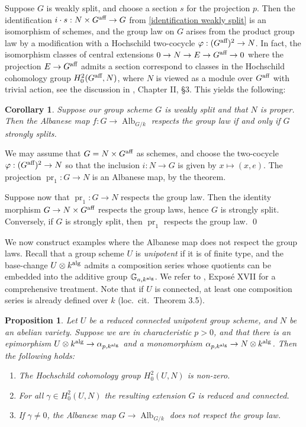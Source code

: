 \documentclass[oneside, 12pt]{amsart}
\newcommand\mylabel[1]{\label{#1}\marginpar{\vspace{-1ex}\medskip\medskip\footnotesize \tt #1}}
\renewcommand\mylabel[1]{\label{#1}}
\newtheorem{proposition}[theorem]{Proposition}
\newtheorem{corollary}[theorem]{Corollary}
\theoremstyle{definition}
\theoremstyle{remark}
\newcommand{\GG}{\mathbb{G}}
\newcommand{\aff}{\text{\rm aff}}
\newcommand{\alg}{\text{\rm alg}}
\newcommand{\Alb}{\operatorname{Alb}}
\newcommand{\pr}{\operatorname{pr}}
\newcommand{\ra}{\rightarrow}
\begin{document}
\medskip
Suppose $G$ is weakly split, and choose a section $s$ for the projection $p$.
Then the identification   $i\cdot s: N\times G^\aff\ra G$ from \eqref{identification weakly split}
is an isomorphism of schemes, and the group law on $G$ arises from the product group law by a modification
with a Hochschild two-cocycle $\varphi:(G^\aff)^2\ra N$. In fact, the isomorphism classes of central extensions $0\ra N\ra E\ra G^\aff\ra 0$ where the projection
$E\ra G^\aff$ admits a section correspond to 
classes in the Hochschild cohomology group $H^2_0(G^\aff, N)$, where $N$ is viewed as a module over $G^\aff$ with trivial action, see the discussion in
\cite{Demazure; Gabriel 1970}, Chapter II, \S3. This yields the following:
 
\begin{corollary}
\mylabel{albanese respect group law}
Suppose our group scheme $G$ is weakly split and that $N$ is proper. 
Then the Albanese map $f:G\ra \Alb_{G/k}$ respects the group law if and only if   $G$ strongly splits.
\end{corollary}

\proof
We may assume that $G=N\times G^\aff$ as schemes, and choose the two-cocycle $\varphi:(G^\aff)^2\ra N$ 
so that the inclusion $i:N\ra G$ is given by $x\mapsto (x,e)$.
The projection $\pr_1:G\ra N$ is   an Albanese map, by the theorem.

Suppose now that $\pr_1:G\ra N$ respects the group law.
Then the identity morphism $G\ra N\times G^\aff$ respects the group laws, hence $G$ is strongly split.
Conversely, if $G$ is strongly split, then $\pr_1$ respects the group law.
\qed

\medskip
We now construct examples where the Albanese map does not respect the group laws.
Recall that a group scheme $U$ is \emph{unipotent} if it is of finite type,
and the base-change $U\otimes k^\alg$ admits  a   composition series whose quotients can be embedded into the additive group $\GG_{a, k^\alg}$.
We refer to  \cite{SGA 3b}, Expos\'e XVII for a  comprehensive treatment.
Note that if $U$ is connected,  at least one composition series is already defined over $k$ (loc.\ cit.\ Theorem 3.5).

\begin{proposition}
\mylabel{albanese disrespects group law}
Let $U$ be a reduced connected unipotent group scheme, and $N$ be an abelian variety.
Suppose we are in characteristic $p>0$, and that there is an epimorphism $U\otimes k^\alg\ra \alpha_{p,k^\alg}$
and a monomorphism $\alpha_{p,k^\alg}\ra N\otimes k^\alg$. Then the following holds:
\begin{enumerate}
\item The Hochschild cohomology group $H^2_0(U,N)$ is non-zero.
\item For all $\gamma\in H^2_0(U,N)$   the resulting extension $G$ is reduced and connected.
\item If $\gamma\neq 0$, the Albanese map $G\ra\Alb_{G/k}$ does not respect the group law.
\end{enumerate}
\end{proposition}
\end{document}
